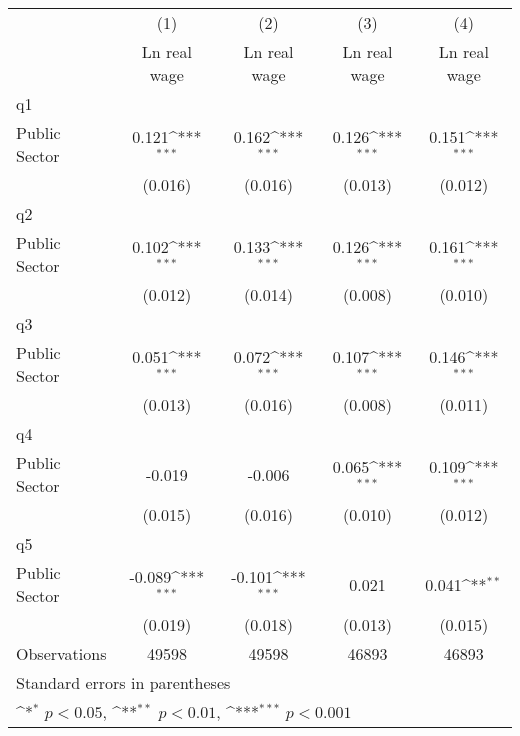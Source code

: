 {
\def\sym#1{\ifmmode^{#1}\else\(^{#1}\)\fi}
\begin{tabular}{l*{4}{c}}
\hline\hline
                    &\multicolumn{1}{c}{(1)}&\multicolumn{1}{c}{(2)}&\multicolumn{1}{c}{(3)}&\multicolumn{1}{c}{(4)}\\
                    &\multicolumn{1}{c}{Ln real wage}&\multicolumn{1}{c}{Ln real wage}&\multicolumn{1}{c}{Ln real wage}&\multicolumn{1}{c}{Ln real wage}\\
\hline
q1                  &                     &                     &                     &                     \\
Public Sector       &       0.121\sym{***}&       0.162\sym{***}&       0.126\sym{***}&       0.151\sym{***}\\
                    &     (0.016)         &     (0.016)         &     (0.013)         &     (0.012)         \\
\hline
q2                  &                     &                     &                     &                     \\
Public Sector       &       0.102\sym{***}&       0.133\sym{***}&       0.126\sym{***}&       0.161\sym{***}\\
                    &     (0.012)         &     (0.014)         &     (0.008)         &     (0.010)         \\
\hline
q3                  &                     &                     &                     &                     \\
Public Sector       &       0.051\sym{***}&       0.072\sym{***}&       0.107\sym{***}&       0.146\sym{***}\\
                    &     (0.013)         &     (0.016)         &     (0.008)         &     (0.011)         \\
\hline
q4                  &                     &                     &                     &                     \\
Public Sector       &      -0.019         &      -0.006         &       0.065\sym{***}&       0.109\sym{***}\\
                    &     (0.015)         &     (0.016)         &     (0.010)         &     (0.012)         \\
\hline
q5                  &                     &                     &                     &                     \\
Public Sector       &      -0.089\sym{***}&      -0.101\sym{***}&       0.021         &       0.041\sym{**} \\
                    &     (0.019)         &     (0.018)         &     (0.013)         &     (0.015)         \\
\hline
Observations        &       49598         &       49598         &       46893         &       46893         \\
\hline\hline
\multicolumn{5}{l}{\footnotesize Standard errors in parentheses}\\
\multicolumn{5}{l}{\footnotesize \sym{*} \(p<0.05\), \sym{**} \(p<0.01\), \sym{***} \(p<0.001\)}\\
\end{tabular}
}
